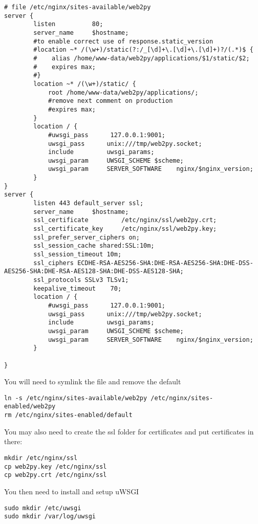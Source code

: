 \documentclass[justified,sixbynine,notoc]{tufte-book}
\begin{document}
\begin{fullwidth}
\begin{lstlisting}
# file /etc/nginx/sites-available/web2py
server {
        listen          80;
        server_name     $hostname;
        #to enable correct use of response.static_version
        #location ~* /(\w+)/static(?:/_[\d]+\.[\d]+\.[\d]+)?/(.*)$ {
        #    alias /home/www-data/web2py/applications/$1/static/$2;
        #    expires max;
        #}
        location ~* /(\w+)/static/ {
            root /home/www-data/web2py/applications/;
            #remove next comment on production
            #expires max;
        }
        location / {
            #uwsgi_pass      127.0.0.1:9001;
            uwsgi_pass      unix:///tmp/web2py.socket;
            include         uwsgi_params;
            uwsgi_param     UWSGI_SCHEME $scheme;
            uwsgi_param     SERVER_SOFTWARE    nginx/$nginx_version;
        }
}
server {
        listen 443 default_server ssl;
        server_name     $hostname;
        ssl_certificate         /etc/nginx/ssl/web2py.crt;
        ssl_certificate_key     /etc/nginx/ssl/web2py.key;
        ssl_prefer_server_ciphers on;
        ssl_session_cache shared:SSL:10m;
        ssl_session_timeout 10m;
        ssl_ciphers ECDHE-RSA-AES256-SHA:DHE-RSA-AES256-SHA:DHE-DSS-AES256-SHA:DHE-RSA-AES128-SHA:DHE-DSS-AES128-SHA;
        ssl_protocols SSLv3 TLSv1;
        keepalive_timeout    70;
        location / {
            #uwsgi_pass      127.0.0.1:9001;
            uwsgi_pass      unix:///tmp/web2py.socket;
            include         uwsgi_params;
            uwsgi_param     UWSGI_SCHEME $scheme;
            uwsgi_param     SERVER_SOFTWARE    nginx/$nginx_version;
        }
 
}
\end{lstlisting}

You will need to symlink the file and remove the default

\begin{lstlisting}
ln -s /etc/nginx/sites-available/web2py /etc/nginx/sites-enabled/web2py
rm /etc/nginx/sites-enabled/default
\end{lstlisting}

You may also need to create the ssl folder for certificates and put certificates in there:
\begin{lstlisting}
mkdir /etc/nginx/ssl
cp web2py.key /etc/nginx/ssl
cp web2py.crt /etc/nginx/ssl
\end{lstlisting}

You then need to install and setup uWSGI

\begin{lstlisting}
sudo mkdir /etc/uwsgi
sudo mkdir /var/log/uwsgi
\end{lstlisting}


\end{fullwidth}
\end{document}
